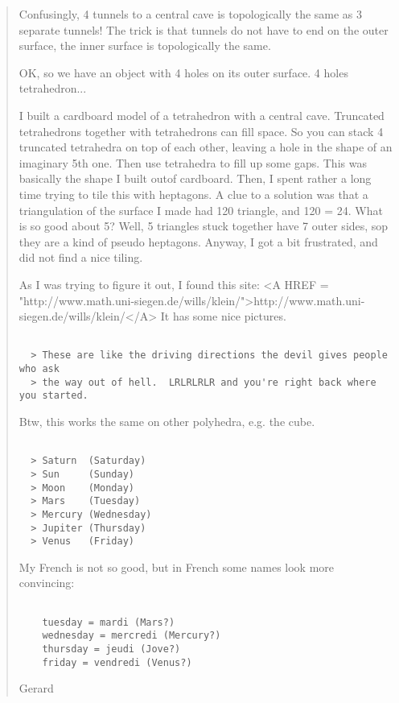 \begin{quote}
Confusingly, 4 tunnels to a central cave is topologically
the same as 3 separate tunnels!  The trick is that tunnels
do not have to end on the outer surface, the inner surface
is topologically the same.

OK, so we have an object with 4 holes on its outer surface.
4 holes \to  tetrahedron...

I built a cardboard model of a tetrahedron with a central
cave.  Truncated tetrahedrons together with tetrahedrons
can fill space.  So you can stack 4 truncated tetrahedra
on top of each other, leaving a hole in the shape of
an imaginary 5th one. Then use tetrahedra to fill up
some gaps. This was basically the shape I built outof
cardboard. Then, I spent rather a long time trying to
tile this with heptagons. A clue to a solution was
that a triangulation of the surface I made had 120
triangle, and 120 = 24. What is so good about 5?
Well, 5 triangles stuck together have 7 outer sides,
sop they are a kind of pseudo heptagons. Anyway, I
got a bit frustrated, and did not find a nice tiling.

As I was trying to figure it out, I found this site:
<A HREF = "http://www.math.uni-siegen.de/wills/klein/">http://www.math.uni-siegen.de/wills/klein/</A>
It has some nice pictures.


\begin{verbatim}

  > These are like the driving directions the devil gives people who ask
  > the way out of hell.  LRLRLRLR and you're right back where you started.
\end{verbatim}
    
Btw, this works the same on other polyhedra, e.g. the cube.


\begin{verbatim}

  > Saturn  (Saturday)
  > Sun     (Sunday)
  > Moon    (Monday)
  > Mars    (Tuesday)
  > Mercury (Wednesday)
  > Jupiter (Thursday)
  > Venus   (Friday)
\end{verbatim}
    

My French is not so good, but in French some names look more
convincing:


\begin{verbatim}

    tuesday = mardi (Mars?)
    wednesday = mercredi (Mercury?)
    thursday = jeudi (Jove?)
    friday = vendredi (Venus?)
\end{verbatim}
    

Gerard
\end{quote}

